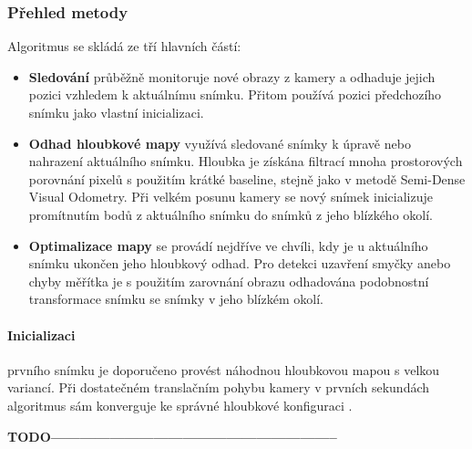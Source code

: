\documentclass[12pt,a4paper]{article}
\begin{document}
\subsubsection{Přehled metody}
Algoritmus se skládá ze tří hlavních částí:
\begin{itemize}
	\item \textbf{Sledování} průběžně monitoruje nové obrazy z kamery a odhaduje jejich pozici vzhledem k aktuálnímu snímku. Přitom používá pozici předchozího snímku jako vlastní inicializaci. 
	\item \textbf{Odhad hloubkové mapy} využívá sledované snímky k úpravě nebo nahrazení aktuálního snímku. Hloubka je získána filtrací mnoha prostorových porovnání pixelů s použitím krátké baseline, stejně jako v metodě Semi-Dense Visual Odometry. Při velkém posunu kamery se nový snímek inicializuje promítnutím bodů z aktuálního snímku do snímků z jeho blízkého okolí. 
	\item \textbf{Optimalizace mapy} se provádí nejdříve ve chvíli, kdy je u aktuálního snímku ukončen jeho hloubkový odhad. Pro detekci uzavření smyčky anebo chyby měřítka je s použitím zarovnání obrazu odhadována podobnostní transformace snímku se snímky v jeho blízkém okolí.
\end{itemize}

\paragraph{Inicializaci} prvního snímku je doporučeno provést náhodnou hloubkovou mapou s velkou variancí. Při dostatečném translačním pohybu kamery v prvních sekundách algoritmus sám konverguje ke správné hloubkové konfiguraci \cite{Engel14_LSD}.



\textsf{\textbf{TODO-----------------------------------------------------------}}



\end{document}
